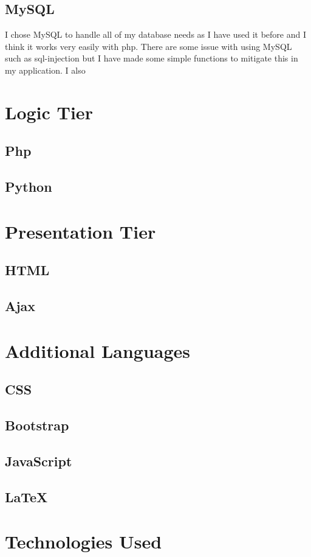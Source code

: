 \subsection{MySQL}
I chose MySQL to handle all of my database needs as I have used it before and I think it works very easily with php. There are some issue with using MySQL such as sql-injection but I have made some simple functions to mitigate this in my application. I also 

\section{Logic Tier}
\subsection{Php}
\subsection{Python}


\section{Presentation Tier}
\subsection{HTML}
\subsection{Ajax}

\section{Additional Languages}
\subsection{CSS}
\subsection{Bootstrap}
\subsection{JavaScript}
\subsection{LaTeX}

\section{Technologies Used}
